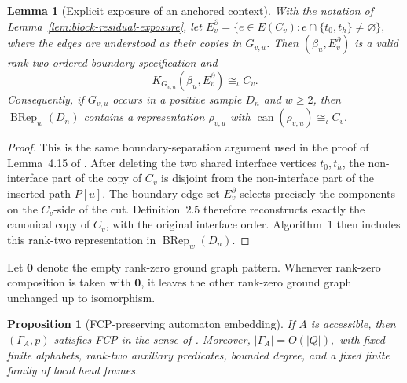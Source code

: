 \documentclass[11pt]{article}
\newtheorem{proposition}[theorem]{Proposition}
\newtheorem{lemma}[theorem]{Lemma}
\theoremstyle{definition}
\theoremstyle{remark}
\begin{document}
\begin{lemma}[Explicit exposure of an anchored context]
\label{lem:anchored-context-exposure}
With the notation of Lemma~\ref{lem:block-residual-exposure}, let
\(E_{v}^{\partial} = \{e\in E(C_v):e\cap\{t_0,t_h\}\ne\varnothing\},\)
where the edges are understood as their copies in \(G_{v,u}\).  Then
\((\beta_u,E_v^{\partial})\) is a valid rank-two ordered boundary
specification and
\[
\boxed{
K_{G_{v,u}}(\beta_u,E_v^{\partial})
\cong_\iota C_v.
}
\]
Consequently, if \(G_{v,u}\) occurs in a positive sample \(D_n\) and
\(w\ge2\), then \(\operatorname{BRep}_w(D_n)\) contains a representation
\(\rho_{v,u}\) with
\(\operatorname{can}(\rho_{v,u})\cong_\iota C_v.\)
\end{lemma}

\begin{proof}
This is the same boundary-separation argument used in the proof of
Lemma~4.15 of \cite{ShoudaiEtAl2026}.  After deleting the two shared interface
vertices \(t_0,t_h\), the non-interface part of the copy of \(C_v\) is
disjoint from the non-interface part of the inserted path \(P[u]\).
The boundary edge set \(E_v^\partial\) selects precisely the components on the
\(C_v\)-side of the cut.  Definition~2.5 therefore reconstructs exactly the
canonical copy of \(C_v\), with the original interface order.  Algorithm~1
then includes this rank-two representation in \(\operatorname{BRep}_w(D_n)\).
\end{proof}

Let \(\mathbf 0\) denote the empty rank-zero ground graph pattern. Whenever
rank-zero composition is taken with \(\mathbf 0\), it leaves the other
rank-zero ground graph unchanged up to isomorphism.

\begin{proposition}[FCP-preserving automaton embedding]\label{prop:fcp-embed}
If \(A\) is accessible, then \((\Gamma_A,p)\) satisfies FCP in the sense of
\cite{ShoudaiEtAl2026}. Moreover,
\(|\Gamma_A|=O(|Q|),\)
with fixed finite alphabets, rank-two auxiliary predicates, bounded degree,
and a fixed finite family of local head frames.
\end{proposition}
\end{document}
